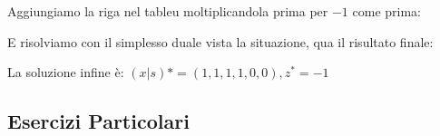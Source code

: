 \documentclass{article}
\begin{document}
Aggiungiamo la riga nel tableu moltiplicandola prima per $-1$ come prima:\\

\begin{center}
\end{center}

E risolviamo con il simplesso duale vista la situazione, qua il risultato finale:\\

\begin{center}
\end{center}

La soluzione infine è: $(x|s)*=(1,1,1,1,0,0), z^* = -1$






\subsection{Esercizi Particolari}
\end{document}
